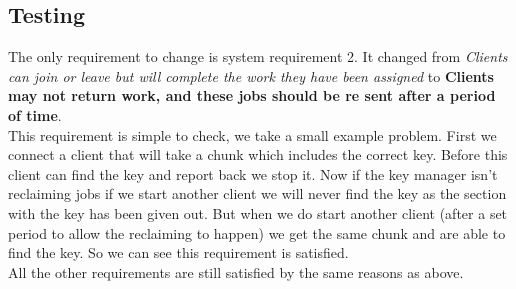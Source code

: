 \documentclass[a4paper, 12pt]{article}
\begin{document}
  			
  		\subsection{Testing}
  			The only requirement to change is system requirement 2. It changed from \textit{Clients can join or leave but will complete the work they have been assigned} to \textbf{Clients may not return work, and these jobs should be re sent after a period of time}.\\
  			
  			This requirement is simple to check, we take a small example problem. First we connect a client that will take a chunk which includes the correct key. Before this client can find the key and report back we stop it. Now if the key manager isn't reclaiming jobs if we start another client we will never find the key as the section with the key has been given out. But when we do start another client (after a set period to allow the reclaiming to happen) we get the same chunk and are able to find the key. So we can see this requirement is satisfied.\\
  			
  			All the other requirements are still satisfied by the same reasons as above.
\end{document}
